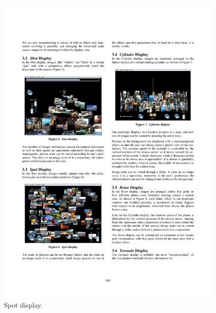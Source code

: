 \begin{figure}[ht]
	\begin{minipage}[b]{0.5\textwidth}
		\centering
		\includegraphics[width=\textwidth]{imgs-RelatedWork/Porta-spot}
		\caption{Spot display.}
		\label{fig:porta-spot}
	\end{minipage}
	\begin{minipage}[b]{0.5\textwidth}
		\centering

\end{minipage}
\end{figure}
